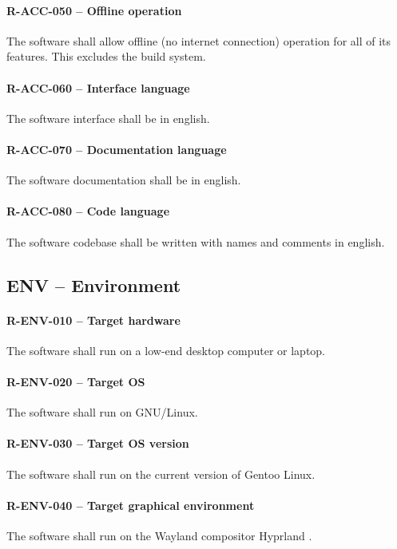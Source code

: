 \paragraph{R-ACC-050 -- Offline operation}
The software shall allow offline (no internet connection) operation for all of
its features. This excludes the build system.

\paragraph{R-ACC-060 -- Interface language}
The software interface shall be in english.

\paragraph{R-ACC-070 -- Documentation language}
The software documentation shall be in english.

\paragraph{R-ACC-080 -- Code language}
The software codebase shall be written with names and comments
in english.

\subsection{ENV -- Environment}
\paragraph{R-ENV-010 -- Target hardware}
The software shall run on a low-end desktop computer or laptop.

\paragraph{R-ENV-020 -- Target OS}
The software shall run on GNU/Linux.

\paragraph{R-ENV-030 -- Target OS version}
The software shall run on the current version of Gentoo Linux.

\paragraph{R-ENV-040 -- Target graphical environment}
The software shall run on the Wayland compositor Hyprland \cite{hyprland}.


